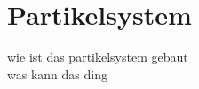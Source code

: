 \section{Partikelsystem}
\begin{Spacing}{\mylinespace}

wie ist das partikelsystem gebaut\\
was kann das ding\\

\end{Spacing}
\newpage
\clearpage
